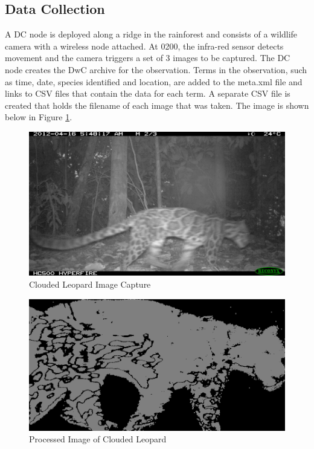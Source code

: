 		\subsection{Data Collection}
			A DC node is deployed along a ridge in the rainforest and consists of a wildlife camera with a wireless node attached. At 0200, the infra-red sensor detects movement and the camera triggers a set of 3 images to be captured. The DC node creates the DwC archive for the observation. Terms in the observation, such as time, date, species identified and location, are added to the meta.xml file and links to CSV files that contain the data for each term. A separate CSV file is created that holds the filename of each image that was taken. The image is shown below in Figure \ref{cl2}.
			
			\begin{figure}[!t]
			\centering
			\includegraphics[width=\textwidth]{Chap4/figures/leopard2.JPG}
			\caption{Clouded Leopard Image Capture}
			\label{cl2}
			\end{figure}

			\begin{figure}[!t]
			\centering
			\includegraphics[width=\textwidth]{Chap4/figures/leopard_proc}
			\caption{Processed Image of Clouded Leopard}
			\label{clproc}
			\end{figure}
			
